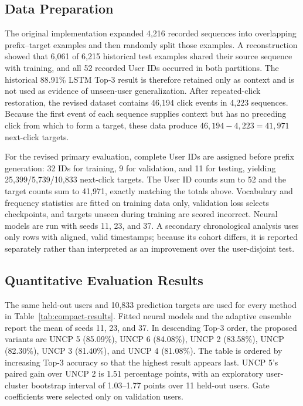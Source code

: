 \documentclass[sn-mathphys-num, Numbered]{sn-jnl}%
\theoremstyle{thmstyleone}%
\theoremstyle{thmstyletwo}%
\theoremstyle{thmstylethree}%
\providecommand{\DIFadd}[1]{{\protect\color{green!40!black}#1}} %
\providecommand{\DIFaddbegin}{} %
\providecommand{\DIFaddend}{} %
\newcommand{\DIFaddincludegraphics}[2][]{{\color{blue}\fbox{\DIFOincludegraphics[#1]{#2}}}} %
\DeclareRobustCommand{\DIFaddbegin}{\DIFOaddbegin \let\includegraphics\DIFaddincludegraphics} %
\DeclareRobustCommand{\DIFaddend}{\DIFOaddend \let\includegraphics\DIFOincludegraphics} %
\begin{document}
\DIFaddbegin \subsection{\DIFadd{Data Preparation}}
\DIFadd{The original implementation expanded 4,216 recorded sequences into overlapping prefix--target examples and then randomly split those examples. A reconstruction showed that 6,061 of 6,215 historical test examples shared their source sequence with training, and all 52 recorded User IDs occurred in both partitions. The historical 88.91\% LSTM Top-3 result is therefore retained only as context and is not used as evidence of unseen-user generalization. After repeated-click restoration, the revised dataset contains 46,194 click events in 4,223 sequences. Because the first event of each sequence supplies context but has no preceding click from which to form a target, these data produce $46{,}194-4{,}223=41{,}971$ next-click targets.
}

\DIFadd{For the revised primary evaluation, complete User IDs are assigned before prefix generation: 32 IDs for training, 9 for validation, and 11 for testing, yielding 25,399/5,739/10,833 next-click targets. The User ID counts sum to 52 and the target counts sum to 41,971, exactly matching the totals above. Vocabulary and frequency statistics are fitted on training data only, validation loss selects checkpoints, and targets unseen during training are scored incorrect. Neural models are run with seeds 11, 23, and 37. A secondary chronological analysis uses only rows with aligned, valid timestamps; because its cohort differs, it is reported separately rather than interpreted as an improvement over the user-disjoint test.
}


\DIFaddend \subsection{Quantitative Evaluation Results}
\DIFaddbegin \DIFadd{The same held-out users and 10,833 prediction targets are used for every method in Table~\ref{tab:compact-results}. Fitted neural models and the adaptive ensemble report the mean of seeds 11, 23, and 37. In descending Top-3 order, the proposed variants are UNCP 5 (85.09\%), UNCP 6 (84.08\%), UNCP 2 (83.58\%), UNCP (82.30\%), UNCP 3 (81.40\%), and UNCP 4 (81.08\%). The table is ordered by increasing Top-3 accuracy so that the highest result appears last. UNCP 5's paired gain over UNCP 2 is 1.51 percentage points, with an exploratory user-cluster bootstrap interval of 1.03--1.77 points over 11 held-out users. Gate coefficients were selected only on validation users.
}
\end{document}
